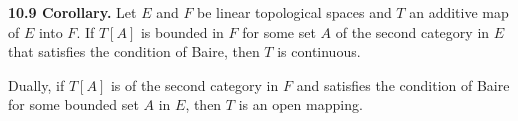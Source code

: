 \textbf{10.9 Corollary.} Let $E$ and $F$ be linear topological spaces and $T$ an additive map of $E$ into $F$. If $T[A]$ is bounded in $F$ for some set $A$ of the second category in $E$ that satisfies the condition of Baire, then $T$ is continuous.

Dually, if $T[A]$ is of the second category in $F$ and satisfies the condition of Baire for some bounded set $A$ in $E$, then $T$ is an open mapping.
